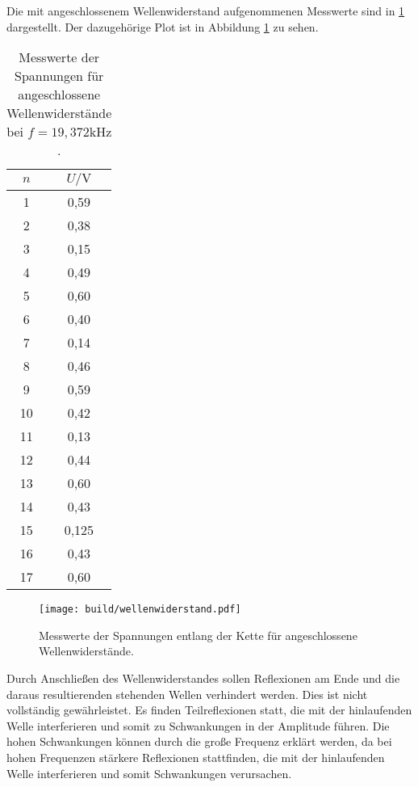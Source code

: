 Die mit angeschlossenem Wellenwiderstand aufgenommenen Messwerte sind in \ref{tab:wellenwiderstand} dargestellt. Der dazugehörige Plot ist in Abbildung \ref{fig:wellenwiderstand} zu sehen.
\begin{table}
  \centering
  \caption{Messwerte der Spannungen für angeschlossene Wellenwiderstände bei $f = 19,372 \si{\kilo \Hz}$.}
  \label{tab:wellenwiderstand}
  \begin{tabular}{c c}
    \toprule
    $n$ & $U / \si{\volt}$\\
    \midrule
1 & 0,59 \\
2 & 0,38 \\
3 & 0,15 \\
4 & 0,49 \\
5 & 0,60 \\
6 & 0,40 \\
7 & 0,14 \\
8 & 0,46 \\
9 & 0,59 \\
10 & 0,42 \\
11 & 0,13 \\
12 & 0,44 \\
13 & 0,60 \\
14 & 0,43 \\
15 & 0,125 \\
16 & 0,43 \\
17 & 0,60 \\
\bottomrule
\end{tabular}
\end{table}

\begin{figure}
  \centering
  \texttt{[image: build/wellenwiderstand.pdf]}
\caption{Messwerte der Spannungen entlang der Kette für angeschlossene Wellenwiderstände.}
  \label{fig:wellenwiderstand}
\end{figure}

Durch Anschließen des Wellenwiderstandes sollen Reflexionen am Ende und die daraus resultierenden stehenden Wellen verhindert werden. Dies ist nicht vollständig gewährleistet. Es finden Teilreflexionen statt, die mit der hinlaufenden Welle interferieren und somit zu Schwankungen in der Amplitude führen. Die hohen Schwankungen können durch die große Frequenz erklärt werden, da bei hohen Frequenzen stärkere Reflexionen stattfinden, die mit der hinlaufenden Welle interferieren und somit Schwankungen verursachen.
